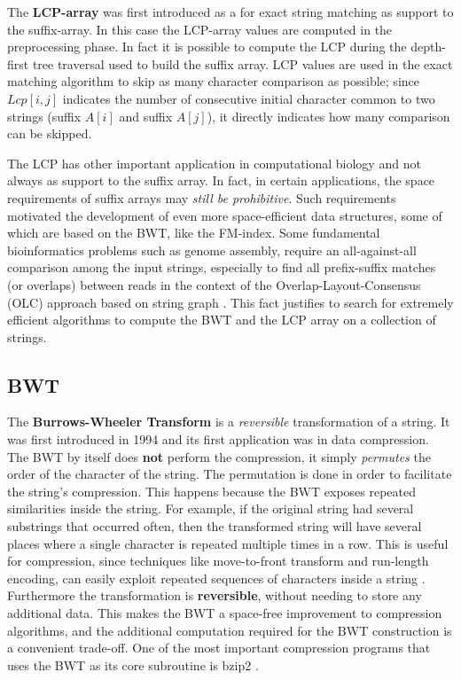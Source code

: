 \documentclass[a4paper,12pt, oneside]{article}
\begin{document}
The \textbf{LCP-array} was first introduced as a  for exact string matching as support to the suffix-array. In this case the LCP-array values are computed in the preprocessing phase. In fact it is possible to compute the LCP during the depth-first tree traversal used to build the suffix array. LCP values are used in the exact matching algorithm to skip as many character comparison as possible; since $Lcp[i, j]$ indicates the number of consecutive initial character common to two strings (suffix $A[i]$ and suffix $A[j]$), it directly indicates how many comparison can be skipped. \par
The LCP has other important application in computational biology and not always as support to the suffix array. In fact, in certain applications, the space requirements of suffix arrays may \textit{still be prohibitive}. Such requirements motivated the development of even more space-efficient data structures, some of which are based on the BWT, like the FM-index. Some fundamental bioinformatics problems such as genome assembly, require an all-against-all comparison among the input strings, especially to find all prefix-suffix matches (or overlaps) between reads in the context of the Overlap-Layout-Consensus (OLC) approach based on string graph \cite{stringgraphs}. This fact justifies to search for extremely efficient algorithms to compute the BWT and the LCP array on a collection of strings.

\subsection{BWT}
The \textbf{Burrows-Wheeler Transform} is a \textit{reversible} transformation of a string. It was first introduced in 1994 \cite{bwt} and its first application was in data compression. The BWT by itself does \textbf{not} perform the compression, it simply \textit{permutes} the order of the character of the string. The permutation is done in order to facilitate the string's compression. This happens because the BWT exposes repeated similarities inside the string. For example, if the original string had several substrings that occurred often, then the transformed string will have several places where a single character is repeated multiple times in a row. This is useful for compression, since techniques like move-to-front transform and run-length encoding, can easily exploit repeated sequences of characters inside a string \cite{bwt}. Furthermore the transformation is \textbf{reversible}, without needing to store any additional data. This makes the BWT a space-free improvement to compression algorithms, and the additional computation required for the BWT construction is a convenient trade-off.
One of the most important compression programs that uses the BWT as its core subroutine is bzip2 \cite{bzip2}. \newline
\end{document}
